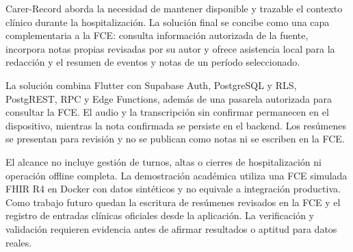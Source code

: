 Carer-Record aborda la necesidad de mantener disponible y trazable el contexto clínico durante la hospitalización. La solución final se concibe como una capa complementaria a la FCE: consulta información autorizada de la fuente, incorpora notas propias revisadas por su autor y ofrece asistencia local para la redacción y el resumen de eventos y notas de un período seleccionado.

La solución combina Flutter con Supabase Auth, PostgreSQL y RLS, PostgREST, RPC y Edge Functions, además de una pasarela autorizada para consultar la FCE. El audio y la transcripción sin confirmar permanecen en el dispositivo, mientras la nota confirmada se persiste en el backend. Los resúmenes se presentan para revisión y no se publican como notas ni se escriben en la FCE.

El alcance no incluye gestión de turnos, altas o cierres de hospitalización ni operación offline completa. La demostración académica utiliza una FCE simulada FHIR R4 en Docker con datos sintéticos y no equivale a integración productiva. Como trabajo futuro quedan la escritura de resúmenes revisados en la FCE y el registro de entradas clínicas oficiales desde la aplicación. La verificación y validación requieren evidencia antes de afirmar resultados o aptitud para datos reales.
